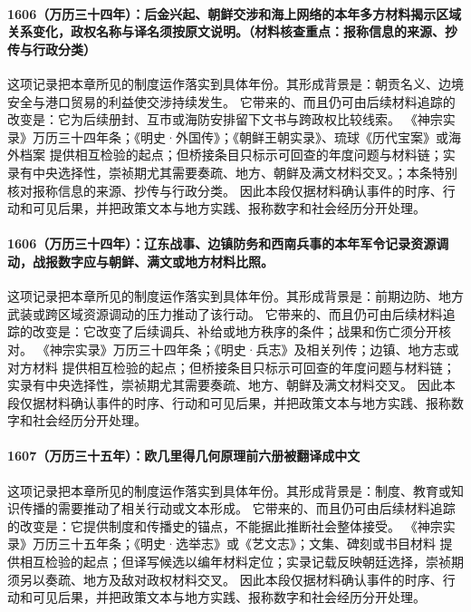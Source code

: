 \paragraph{1606（万历三十四年）：后金兴起、朝鲜交涉和海上网络的本年多方材料揭示区域关系变化，政权名称与译名须按原文说明。（材料核查重点：报称信息的来源、抄传与行政分类）} 这项记录把本章所见的制度运作落实到具体年份。其形成背景是：朝贡名义、边境安全与港口贸易的利益使交涉持续发生。 它带来的、而且仍可由后续材料追踪的改变是：它为后续册封、互市或海防安排留下文书与跨政权比较线索。 《神宗实录》万历三十四年条；《明史·外国传》；《朝鲜王朝实录》、琉球《历代宝案》或海外档案 提供相互检验的起点；但桥接条目只标示可回查的年度问题与材料链；实录有中央选择性，崇祯期尤其需要奏疏、地方、朝鲜及满文材料交叉。；本条特别核对报称信息的来源、抄传与行政分类。 因此本段仅据材料确认事件的时序、行动和可见后果，并把政策文本与地方实践、报称数字和社会经历分开处理。

\paragraph{1606（万历三十四年）：辽东战事、边镇防务和西南兵事的本年军令记录资源调动，战报数字应与朝鲜、满文或地方材料比照。} 这项记录把本章所见的制度运作落实到具体年份。其形成背景是：前期边防、地方武装或跨区域资源调动的压力推动了该行动。 它带来的、而且仍可由后续材料追踪的改变是：它改变了后续调兵、补给或地方秩序的条件；战果和伤亡须分开核对。 《神宗实录》万历三十四年条；《明史·兵志》及相关列传；边镇、地方志或对方材料 提供相互检验的起点；但桥接条目只标示可回查的年度问题与材料链；实录有中央选择性，崇祯期尤其需要奏疏、地方、朝鲜及满文材料交叉。 因此本段仅据材料确认事件的时序、行动和可见后果，并把政策文本与地方实践、报称数字和社会经历分开处理。

\paragraph{1607（万历三十五年）：欧几里得几何原理前六册被翻译成中文} 这项记录把本章所见的制度运作落实到具体年份。其形成背景是：制度、教育或知识传播的需要推动了相关行动或文本形成。 它带来的、而且仍可由后续材料追踪的改变是：它提供制度和传播史的锚点，不能据此推断社会整体接受。 《神宗实录》万历三十五年条；《明史·选举志》或《艺文志》；文集、碑刻或书目材料 提供相互检验的起点；但译写候选以编年材料定位；实录记载反映朝廷选择，崇祯期须另以奏疏、地方及敌对政权材料交叉。 因此本段仅据材料确认事件的时序、行动和可见后果，并把政策文本与地方实践、报称数字和社会经历分开处理。

